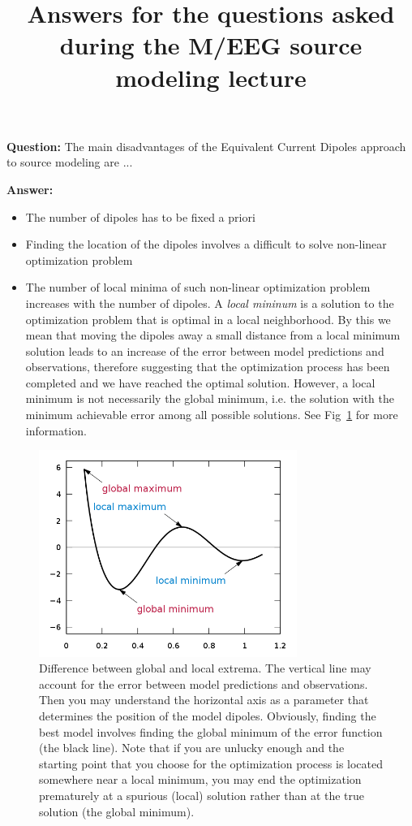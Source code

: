 \documentclass[a4paper,10pt,oneside]{article}
\title{Answers for the questions asked during the M/EEG source modeling lecture}
\begin{document}
\maketitle

\noindent \textbf{Question:} The main disadvantages of the Equivalent Current Dipoles approach to source modeling are ...

\noindent \textbf{Answer:}

\begin{itemize}

\item The number of dipoles has to be fixed a priori

\item Finding the location of the dipoles involves a difficult to solve non-linear optimization problem

\item The number of local minima of such non-linear optimization problem increases with the number of dipoles. A \emph{local mininum} is a solution to the optimization problem that is optimal in a local neighborhood. By this we mean that moving the dipoles away a small distance from a local minimum solution leads to an increase of the error between model predictions and observations, therefore suggesting that the optimization process has been completed and we have reached the optimal solution. However, a local minimum is not necessarily the global minimum, i.e. the solution with the minimum achievable error among all possible solutions. See Fig~\ref{fig:local} for more information.

\end{itemize}


\begin{figure}
	\centering
		\includegraphics[width=0.75\textwidth]{img/local-minima}
	\caption{Difference between global and local extrema. The vertical line may account for the error between model predictions and observations. Then you may understand the horizontal axis as a parameter that determines the position of the model dipoles. Obviously, finding the best model involves finding the global minimum of the error function (the black line). Note that if you are unlucky enough and the starting point that you choose for the optimization process is located somewhere near a local minimum, you may end the optimization prematurely at a spurious (local) solution rather than at the true solution (the global minimum).}
	\label{fig:local}
\end{figure}
\end{document}
